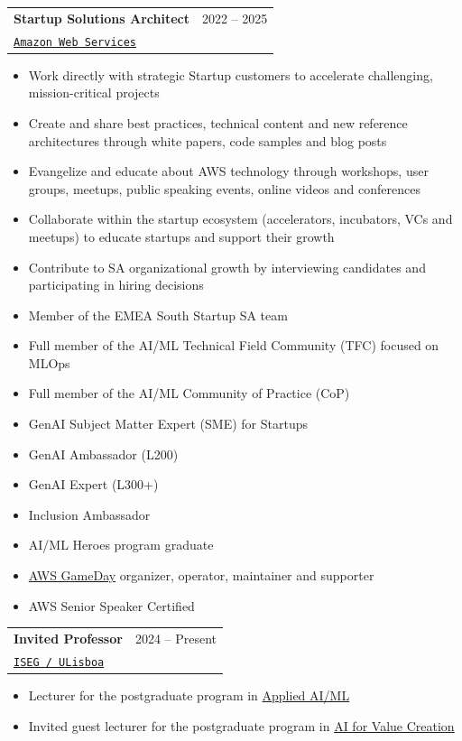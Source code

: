 \documentclass[letterpaper,11pt]{article}
\makeatletter
\newcommand{\resumeSubheading}[4]{
  \vspace{-2pt}\item
    \begin{tabular*}{0.97\textwidth}[t]{l@{\extracolsep{\fill}}r}
      \textbf{#1} & #2 \\
      \texttt{\small#3} & \textit{\small #4} \\
    \end{tabular*}\vspace{-7pt}
}
\makeatother
\begin{document}
    \vspace{2mm}
    \resumeSubheading
      {Startup Solutions Architect}{2022 -- 2025}
      {\href{https://aws.amazon.com/}{Amazon Web Services}}{}
    \vspace{2mm}
        \begin{itemize}
            \item Work directly with strategic Startup customers to accelerate challenging, mission-critical projects
            \item Create and share best practices, technical content and new reference architectures through white papers, code samples and blog posts
            \item Evangelize and educate about AWS technology through workshops, user groups, meetups, public speaking events, online videos and conferences
            \item Collaborate within the startup ecosystem (accelerators, incubators, VCs and meetups) to educate startups and support their growth
            \item Contribute to SA organizational growth by interviewing candidates and participating in hiring decisions
            \item Member of the EMEA South Startup SA team
            \item Full member of the AI/ML Technical Field Community (TFC) focused on MLOps
            \item Full member of the AI/ML Community of Practice (CoP)
            \item GenAI Subject Matter Expert (SME) for Startups
            \item GenAI Ambassador (L200)
            \item GenAI Expert (L300+)
            \item Inclusion Ambassador
            \item AI/ML Heroes program graduate
            \item \href{https://aws.amazon.com/gameday/}{AWS GameDay} organizer, operator, maintainer and supporter
            \item AWS Senior Speaker Certified
        \end{itemize}
    \vspace{1mm}

    \resumeSubheading
      {Invited Professor}{2024 -- Present}
      {\href{https://iseg.ulisboa.pt}{ISEG / ULisboa}}{}
    \vspace{2mm}
        \begin{itemize}
            \item Lecturer for the postgraduate program in \href{https://isegexecutive.education/pt/cursos/pos-graduacoes/applied-artificial-intelligence-machine-learning/}{Applied AI/ML}
            \item Invited guest lecturer for the postgraduate program in \href{https://isegexecutive.education/pt/cursos/programas-executivos/artificial-intelligence-for-value-creation-inovar-e-desenvolver-negocios/}{AI for Value Creation}
        \end{itemize}
    \vspace{1mm}
\end{document}
